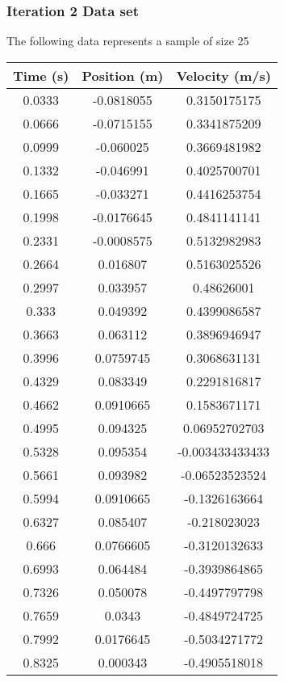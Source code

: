 \documentclass{report}
\begin{document}
     \pagebreak 
     \subsubsection{Iteration 2 Data set}
     \bigbreak \noindent 
     The following data represents a sample of size 25
     \bigbreak \noindent 
     \begin{center}
         \begin{tabular}{c|c|c}
             Time (s) & Position (m) & Velocity (m/s) \\
             \hline
             0.0333	&-0.0818055	&0.3150175175\\
             0.0666	&-0.0715155	&0.3341875209\\
             0.0999	&-0.060025	&0.3669481982\\
             0.1332	&-0.046991	&0.4025700701\\
             0.1665	&-0.033271	&0.4416253754\\
             0.1998	&-0.0176645	&0.4841141141\\
             0.2331	&-0.0008575	&0.5132982983\\
             0.2664	&0.016807	&0.5163025526\\
             0.2997	&0.033957	&0.48626001\\
             0.333	&0.049392	&0.4399086587\\
             0.3663	&0.063112	&0.3896946947\\
             0.3996	&0.0759745	&0.3068631131\\
             0.4329	&0.083349	&0.2291816817\\
             0.4662	&0.0910665	&0.1583671171\\
             0.4995	&0.094325	&0.06952702703\\
             0.5328	&0.095354	&-0.003433433433\\
             0.5661	&0.093982	&-0.06523523524\\
             0.5994	&0.0910665	&-0.1326163664\\
             0.6327	&0.085407	&-0.218023023\\
             0.666	&0.0766605	&-0.3120132633\\
             0.6993	&0.064484	&-0.3939864865\\
             0.7326	&0.050078	&-0.4497797798\\
             0.7659	&0.0343	&-0.4849724725\\
             0.7992	&0.0176645	&-0.5034271772\\
             0.8325	&0.000343	&-0.4905518018
         \end{tabular}
     \end{center}
\end{document}
